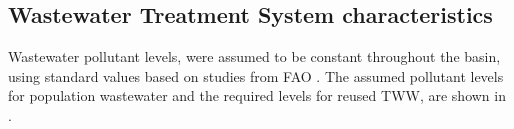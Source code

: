 \subsection{Wastewater Treatment System characteristics}


Wastewater pollutant levels, were assumed to be constant throughout the basin, using standard values based on studies from FAO \cite{fao1985water}. The assumed pollutant levels for population wastewater and the required levels for reused TWW, are shown in .

